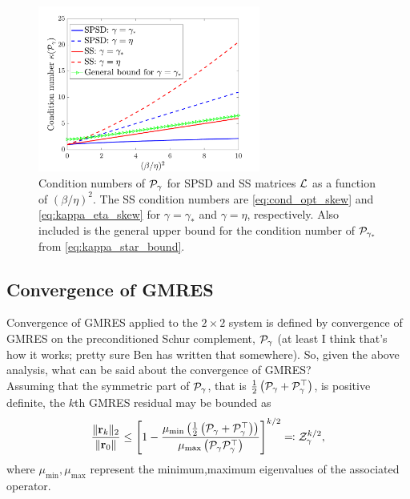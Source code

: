 \documentclass[a4paper,10pt]{article}
\begin{document}
{\begin{itemize}
\begin{figure}[!htb]
\label{fig:conds_all}
\centering
\includegraphics[width=0.65\textwidth]{figures/conds_spsd_ss}
\caption{Condition numbers of ${\cal P}_{\gamma}$ for SPSD and SS matrices ${\cal L}$ as a function of $(\beta/\eta)^2$. The SS condition numbers are \eqref{eq:cond_opt_skew} and \eqref{eq:kappa_eta_skew} for $\gamma = \gamma_*$ and $\gamma = \eta$, respectively. Also included is the general upper bound for the condition number of ${\cal P}_{\gamma_*}$ from \eqref{eq:kappa_star_bound}.}
\end{figure}

\subsection{Convergence of GMRES}

Convergence of GMRES applied to the $2 \times 2$ system is defined by convergence of GMRES on the preconditioned Schur complement, ${\cal P}_{\gamma}$ (at least I think that's how it works; pretty sure Ben has written that somewhere). So, given the above analysis, what can be said about the convergence of GMRES? \\

Assuming that the symmetric part of ${\cal P}_{\gamma}$, that is $\tfrac{1}{2}\left({\cal P}_{\gamma} +  {\cal P}_{\gamma}^\top \right)$, is positive definite, the $k$th GMRES residual may be bounded as
\begin{align} 
\label{eq:gmres_eig_bound}
\frac{\Vert \mathbf{r}_k \Vert_2}{\Vert \mathbf{r}_0 \Vert} \leq
\left[1 -  \frac{\mu_{\min} \left( \tfrac{1}{2} \left( {\cal P}_{\gamma} +  {\cal P}_{\gamma}^\top \right) \right)}{\mu_{\max} \left( {\cal P}_{\gamma} {\cal P}_{\gamma}^\top \right)}  \right]^{k/2} \eqqcolon {\cal Z}_{\gamma}^{k/2},
\end{align}
where $\mu_{\min},\mu_{\max}$ represent  the minimum,maximum eigenvalues of the associated operator.


\end{itemize}}
\end{document}
